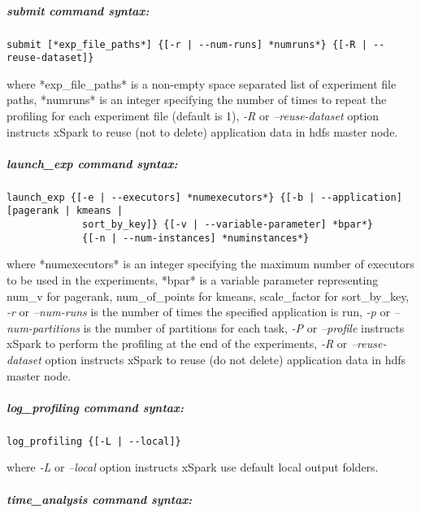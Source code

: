 \documentclass[
]{article}
\let\oldsubparagraph\subparagraph
\renewcommand{\subparagraph}[1]{\oldsubparagraph{#1}\mbox{}}
\begin{document}
\hypertarget{submit-command-syntax}{%
\subparagraph{\texorpdfstring{\emph{submit} command
syntax:}{submit command syntax:}}\label{submit-command-syntax}}

\begin{verbatim}
submit [*exp_file_paths*] {[-r | --num-runs] *numruns*} {[-R | --reuse-dataset]}       
\end{verbatim}

where *exp\_file\_paths* is a non-empty space separated list of
experiment file paths, *numruns* is an integer specifying the number of
times to repeat the profiling for each experiment file (default is 1),
\emph{-R} or \emph{--reuse-dataset} option instructs xSpark to reuse
(not to delete) application data in hdfs master node.

\hypertarget{launch_exp-command-syntax}{%
\subparagraph{\texorpdfstring{\emph{launch\_exp} command
syntax:}{launch\_exp command syntax:}}\label{launch_exp-command-syntax}}

\begin{verbatim}
launch_exp {[-e | --executors] *numexecutors*} {[-b | --application] [pagerank | kmeans | 
             sort_by_key]} {[-v | --variable-parameter] *bpar*} 
             {[-n | --num-instances] *numinstances*} 
\end{verbatim}

where *numexecutors* is an integer specifying the maximum number of
executors to be used in the experiments, *bpar* is a variable parameter
representing num\_v for pagerank, num\_of\_points for kmeans,
scale\_factor for sort\_by\_key, \emph{-r} or \emph{--num-runs} is the
number of times the specified application is run, \emph{-p} or
\emph{--num-partitions} is the number of partitions for each task,
\emph{-P} or \emph{--profile} instructs xSpark to perform the profiling
at the end of the experiments, \emph{-R} or \emph{--reuse-dataset}
option instructs xSpark to reuse (do not delete) application data in
hdfs master node.

\hypertarget{log_profiling-command-syntax}{%
\subparagraph{\texorpdfstring{\emph{log\_profiling} command
syntax:}{log\_profiling command syntax:}}\label{log_profiling-command-syntax}}

\begin{verbatim}
log_profiling {[-L | --local]}
\end{verbatim}

where \emph{-L} or \emph{--local} option instructs xSpark use default
local output folders.

\hypertarget{time_analysis-command-syntax}{%
\subparagraph{\texorpdfstring{\emph{time\_analysis} command
syntax:}{time\_analysis command syntax:}}\label{time_analysis-command-syntax}}
\end{document}
